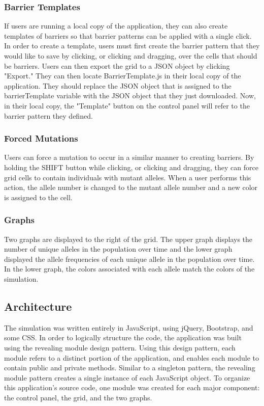 \documentclass[12pt]{article}
\begin{document}
\begin{spacing}{1.5}
\subsubsection{Barrier Templates}
If users are running a local copy of the application, they can also create templates of barriers so that barrier patterns can be applied with a single click. In order to create a template, users must first create the barrier pattern that they would like to save by clicking, or clicking and dragging, over the cells that should be barriers. Users can then export the grid to a JSON object by clicking "Export." They can then locate BarrierTemplate.js in their local copy of the application. They should replace the JSON object that is assigned to the barrierTemplate variable with the JSON object that they just downloaded. Now, in their local copy, the "Template" button on the control panel will refer to the barrier pattern they defined.
\subsubsection{Forced Mutations}
Users can force a mutation to occur in a similar manner to creating barriers. By holding the SHIFT button while clicking, or clicking and dragging, they can force grid cells to contain individuals with mutant alleles. When a user performs this action, the allele number is changed to the mutant allele number and a new color is assigned to the cell.
\subsubsection{Graphs}
Two graphs are displayed to the right of the grid. The upper graph displays the number of unique alleles in the population over time and the lower graph displayed the allele frequencies of each unique allele in the population over time. In the lower graph, the colors associated with each allele match the colors of the simulation.
\subsection{Architecture}
The simulation was written entirely in JavaScript, using jQuery, Bootstrap, and some CSS. In order to logically structure the code, the application was built using the revealing module design pattern. Using this design pattern, each module refers to a distinct portion of the application, and enables each module to contain public and private methods. Similar to a singleton pattern, the revealing module pattern creates a single instance of each JavaScript object. To organize this application's source code, one module was created for each major component: the control panel, the grid, and the two graphs.

\end{spacing}
\end{document}
